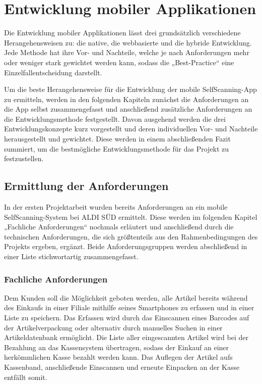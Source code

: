 %
%
%
\chapter{Entwicklung mobiler Applikationen}
Die Entwicklung mobiler Applikationen lässt drei grundsätzlich verschiedene Herangehensweisen zu: die native, die webbasierte und die hybride Entwicklung. Jede Methode hat ihre Vor- und Nachteile, welche je nach Anforderungen mehr oder weniger stark gewichtet werden kann, sodass die „Best-Practice“ eine Einzelfallentscheidung darstellt.

Um die beste Herangehensweise für die Entwicklung der mobile SelfScanning-App zu ermitteln, werden in den folgenden Kapiteln zunächst die Anforderungen an die App selbst zusammengefasst und anschließend zusätzliche Anforderungen an die Entwicklungsmethode festgestellt. Davon ausgehend werden die drei Entwicklungskonzepte kurz vorgestellt und deren individuellen Vor- und Nachteile herausgestellt und gewichtet. Diese werden in einem abschließenden Fazit summiert, um die bestmögliche Entwicklungsmethode für das Projekt zu festzustellen.

\section{Ermittlung der Anforderungen}
In der ersten Projektarbeit wurden bereits Anforderungen an ein mobile SelfScanning-System bei ALDI SÜD ermittelt. Diese werden im folgenden Kapitel „Fachliche Anforderungen“ nochmals erläutert und anschließend durch die technischen Anforderungen, die sich größtenteils aus den Rahmenbedingungen des Projekts ergeben, ergänzt. Beide Anforderungsgruppen werden abschließend in einer Liste stichwortartig zusammengefasst.

\subsection{Fachliche Anforderungen}
Dem Kunden soll die Möglichkeit geboten werden, alle Artikel bereits während des Einkaufs in einer Filiale mithilfe seines Smartphones zu erfassen und in einer Liste zu speichern. Das Erfassen wird durch das Einscannen eines Barcodes auf der Artikelverpackung oder alternativ durch manuelles Suchen in einer Artikeldatenbank ermöglicht. Die Liste aller eingescannten Artikel wird bei der Bezahlung an das Kassensystem übertragen, sodass der Einkauf an einer herkömmlichen Kasse bezahlt werden kann. Das Auflegen der Artikel aufs Kassenband, anschließende Einscannen und erneute Einpacken an der Kasse entfällt somit.

